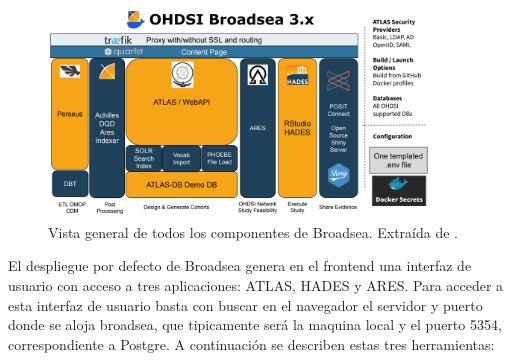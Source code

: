 \begin{figure}[H]
    \centering
    \includegraphics[width=0.90\textwidth]{figures/OHDSIBroadsea3.0.png}
    \caption{Vista general de todos los componentes de Broadsea. Extraída de \cite{Broadsea3PPTX}.}
    \label{fig:OHDSIBroadsea3.0}
\end{figure}

El despliegue por defecto de Broadsea genera en el frontend una interfaz de usuario con acceso a tres aplicaciones: ATLAS, HADES y ARES. Para acceder a esta interfaz de usuario basta con buscar en el navegador el servidor y puerto donde se aloja broadsea, que tipicamente será la maquina local y el puerto 5354, correspondiente a Postgre. A continuación se describen estas tres herramientas:

